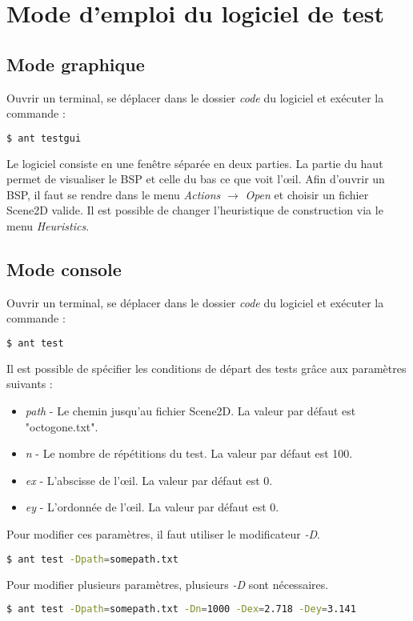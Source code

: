 \documentclass[11pts]{article}
\begin{document}
\newpage
\section{Mode d'emploi du logiciel de test}
\subsection*{Mode graphique}
Ouvrir un terminal, se déplacer dans le dossier \emph{code} du logiciel et exécuter la commande :
\begin{lstlisting}[language=bash]
$ ant testgui
\end{lstlisting}
Le logiciel consiste en une fenêtre séparée en deux parties. La partie du haut permet de visualiser le BSP et celle du bas ce que voit l'œil.
Afin d'ouvrir un BSP, il faut se rendre dans le menu \emph{Actions} $\rightarrow$ \emph{Open} et choisir un fichier Scene2D valide.
Il est possible de changer l'heuristique de construction via le menu \emph{Heuristics}.
\subsection*{Mode console}
Ouvrir un terminal, se déplacer dans le dossier \emph{code} du logiciel et exécuter la commande :
\begin{lstlisting}[language=bash]
$ ant test
\end{lstlisting}
Il est possible de spécifier les conditions de départ des tests grâce aux paramètres suivants :
\begin{itemize}
\item \emph{path} - Le chemin jusqu'au fichier Scene2D. La valeur par défaut est "octogone.txt".
\item \emph{n} - Le nombre de répétitions du test. La valeur par défaut est 100.
\item \emph{ex} - L'abscisse de l'œil. La valeur par défaut est 0.
\item \emph{ey} - L'ordonnée de l'œil. La valeur par défaut est 0.
\end{itemize}
Pour modifier ces paramètres, il faut utiliser le modificateur \emph{-D}.
\begin{lstlisting}[language=bash]
$ ant test -Dpath=somepath.txt
\end{lstlisting}
Pour modifier plusieurs paramètres, plusieurs \emph{-D} sont nécessaires.
\begin{lstlisting}[language=bash]
$ ant test -Dpath=somepath.txt -Dn=1000 -Dex=2.718 -Dey=3.141
\end{lstlisting}
\end{document}

